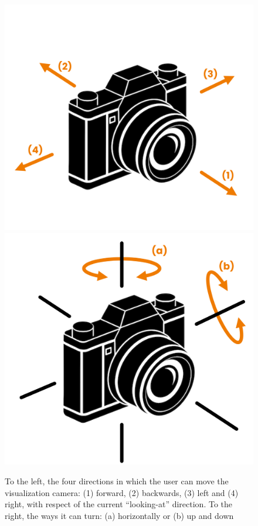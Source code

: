 \begin{figure}[H]
	\centering
	\includegraphics[width=\linewidth]{images/directions-of-moving.png}
	\endminipage\hfill
	\includegraphics[width=\linewidth]{images/directions-of-rotating.png}
	\endminipage

	\caption{To the left, the four directions in which the user can move the visualization camera: (1) forward, (2) backwards, (3) left and (4) right, with respect of the current ``looking-at'' direction. To the right, the ways it can turn: (a) horizontally or (b) up and down}\label{fig:visual:cameradir}
\end{figure}

